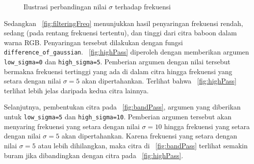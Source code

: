 \begin{figure}
\begin{center}
\caption{Ilustrasi perbandingan nilai $\sigma$ terhadap frekuensi}
\label{fig:sigmaFrekuensi}
\end{center}
\end{figure}

Sedangkan \figurename~\ref{fig:filteringFreq} menunjukkan hasil penyaringan frekuensi rendah, sedang (pada rentang frekuensi tertentu), dan tinggi dari citra baboon dalam warna RGB. Penyaringan tersebut dilakukan dengan fungsi \texttt{difference\_of\_gaussian}. \figurename~\ref{fig:highPass} diperoleh dengan memberikan argumen \texttt{low\_sigma=0} dan \texttt{high\_sigma=5}. Pemberian argumen dengan nilai tersebut bermakna frekuensi tertinggi yang ada di dalam citra hingga frekuensi yang setara dengan nilai $\sigma=5$ akan dipertahankan. Terlihat bahwa \figurename~\ref{fig:highPass} terlihat lebih jelas daripada kedua citra lainnya.

Selanjutnya, pembentukan citra pada \figurename~\ref{fig:bandPass}, argumen yang diberikan untuk \texttt{low\_sigma=5} dan \texttt{high\_sigma=10}. Pemberian argumen tersebut akan menyaring frekuensi yang setara dengan nilai $\sigma=10$ hingga frekuensi yang setara dengan nilai $\sigma=5$ akan dipertahankan. Karena frekuensi yang setara dengan nilai $\sigma=5$ atau lebih dihilangkan, maka citra di \figurename~\ref{fig:bandPass} terlihat semakin buram jika dibandingkan dengan citra pada \figurename~\ref{fig:highPass}.

